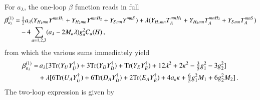 \documentclass[final,3p,times,pdflatex]{elsarticle}
\newcommand{\lamsq}{\lambda^2}
\newcommand{\kapsq}{\kappa^2}
\newcommand{\tr}{\mathrm{Tr}}
\begin{document}
For $a_\lambda$, the one-loop $\beta$ function reads in full
%
\begin{align}
\beta_{a_\lambda}^{(1)} =&\, \tfrac{1}{2}a_\lambda (Y_{H_1mn}Y^{mnH_1} + Y_{H_2mn}Y^{mnH_2}
 + Y_{Smn}Y^{mnS}) + \lambda (Y_{H_1mn}T_A^{mnH_1} + Y_{H_2mn}T_A^{mnH_2} 
+ Y_{Smn}T_A^{mnS}) \notag \\
%
&- 4\sum_{a=1,2,3} (a_\lambda - 2M_a\lambda)g_a^2C_a(H)\,,
\end{align}
%
from which the various sums immediately yield
%
\begin{align}
\beta_{a_\lambda}^{(1)} =&\, a_\lambda[3\tr( Y_U  Y_U^\dagger) + 3\tr( Y_D  Y_D^\dagger) 
+ \tr( Y_E  Y_E^\dagger) + 12\lamsq + 2\kapsq - \tfrac{3}{5}g_1^2 - 3g_2^2] 
\notag \\
%
&+ \lambda[6\tr( U_A  Y_U^\dagger) + 6\tr( D_A  Y_D^\dagger) + 2\tr( E_A  Y_E^\dagger)
+ 4a_\kappa\kappa + \tfrac{6}{5}g_1^2M_1 + 6g_2^2M_2]\,.
\end{align}
%
The two-loop expression is given by
\end{document}
